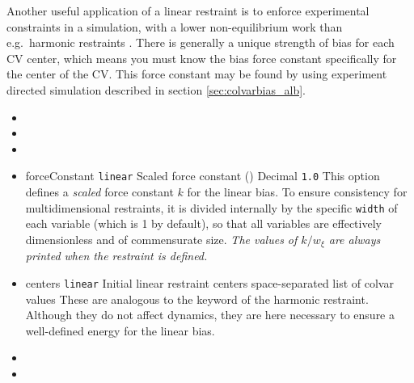 Another useful application of a linear restraint is to enforce experimental constraints in a simulation, with a lower non-equilibrium work than e.g.\ harmonic restraints \cite{Pitera2012}. There is generally a unique strength of bias for each CV center, which means you must know the bias force constant specifically for the center of the CV.  This force constant may be found by using experiment directed simulation described in section \ref{sec:colvarbias_alb}.

\begin{itemize}

\item {}
\item {}
\item {}


\item %
  \keydef
    {forceConstant}{%
    \texttt{linear}}{%
    Scaled force constant (\energyunit)}{%
    Decimal}{%
    \texttt{1.0}}{%
    This option defines a \emph{scaled} force constant $k$ for the linear bias. 
    To ensure consistency for multidimensional restraints, it is divided internally by the specific \texttt{width} of each variable (which is 1 by default), so that all variables are effectively dimensionless and of commensurate size.
    \emph{The values of $k/w_{\xi}$ are always printed when the restraint is defined.}
}

\item %
  \key
    {centers}{%
    \texttt{linear}}{%
    Initial linear restraint centers}{%
    space-separated list of colvar values}{%
    These are analogous to the  keyword of the harmonic restraint.
    Although they do not affect dynamics, they are here necessary to ensure a well-defined energy for the linear bias.}

\item {}
\item {}


\end{itemize}
